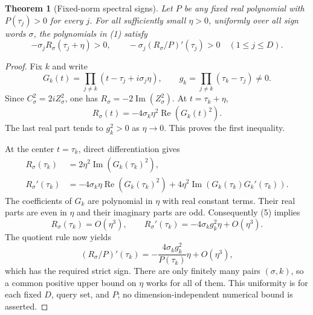 \documentclass[11pt]{article}
\newtheorem{theorem}{Theorem}
\begin{document}
\begin{theorem}[Fixed-norm spectral signs]
Let $P$ be any fixed real polynomial with $P(\tau_j)>0$ for every
$j$. For all sufficiently small $\eta>0$, uniformly over all sign
words $\sigma$, the polynomials in (1) satisfy
\[
 -\sigma_j R_\sigma(\tau_j+\eta)>0,
 \qquad
 -\sigma_j(R_\sigma/P)'(\tau_j)>0
                         \quad(1\leq j\leq D).                \tag{3}
\]
\end{theorem}
\begin{proof}
Fix $k$ and write
\[
 G_k(t)=\prod_{j\ne k}(t-\tau_j+i\sigma_j\eta),\qquad
 g_k=\prod_{j\ne k}(\tau_k-\tau_j)\ne0.
\]
Since $C_\sigma^2=2iZ_\sigma^2$, one has
$R_\sigma=-2\operatorname{Im}(Z_\sigma^2)$. At $t=\tau_k+\eta$,
\[
 R_\sigma(t)=-4\sigma_k\eta^2\operatorname{Re}(G_k(t)^2).
                                                               \tag{4}
\]
The last real part tends to $g_k^2>0$ as $\eta\to0$.
This proves the first inequality.

At the center $t=\tau_k$, direct differentiation gives
\[
 \begin{aligned}
 R_\sigma(\tau_k)&=2\eta^2\operatorname{Im}(G_k(\tau_k)^2),\\
 R_\sigma'(\tau_k)
 &=-4\sigma_k\eta\operatorname{Re}(G_k(\tau_k)^2)
       +4\eta^2\operatorname{Im}(G_k(\tau_k)G_k'(\tau_k)).
 \end{aligned}                                                 \tag{5}
\]
The coefficients of $G_k$ are polynomial in $\eta$ with real
constant terms. Their real parts are even in $\eta$ and their
imaginary parts are odd. Consequently (5) implies
\[
 R_\sigma(\tau_k)=O(\eta^3),\qquad
 R_\sigma'(\tau_k)=-4\sigma_k g_k^2\eta+O(\eta^3).
\]
The quotient rule now yields
\[
 (R_\sigma/P)'(\tau_k)
       =-\frac{4\sigma_k g_k^2}{P(\tau_k)}\eta+O(\eta^3),
                                                               \tag{6}
\]
which has the required strict sign. There are only finitely many
pairs $(\sigma,k)$, so a common positive upper bound on $\eta$
works for all of them. This uniformity is for each fixed $D$, query
set, and $P$; no dimension-independent numerical bound is asserted.
\end{proof}
\end{document}
